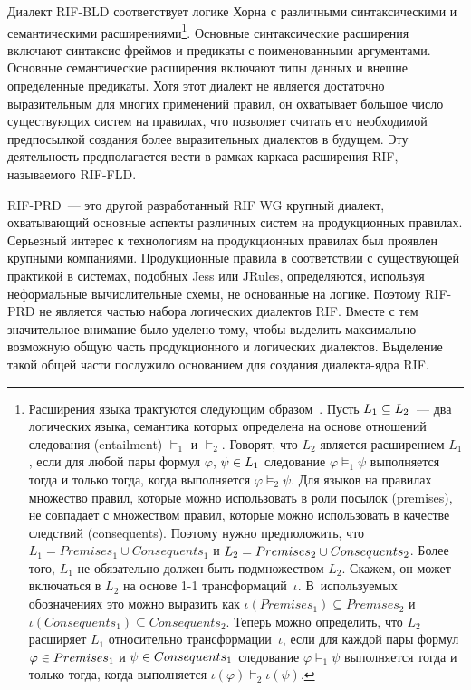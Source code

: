 \begin{multicols}{2}
Диалект RIF-BLD соответствует логике Хорна с различными синтаксическими и 
семантическими расширениями\footnote{Расширения языка трактуются следующим 
образом~\cite{25kal}. Пусть $L_1\hm\subseteq L_2$~--- два логических языка, семантика 
которых определена на основе отношений следования (entailment) $\models_1$ и 
$\models_2$. Говорят, что $L_2$ является расширением $L_1$, если для любой пары формул 
$\varphi$, $\psi\hm\in L_1$ следование $\varphi\models_1\psi$ выполняется тогда и только 
тогда, когда выполняется $\varphi\models_2\psi$. Для языков на правилах множество 
правил, которые можно использовать в роли посылок (premises), не совпадает с множеством 
правил, которые можно использовать в качестве следствий (consequents). Поэтому нужно 
предположить, что $L_1=Premises_1 \cup Consequents_1$ и $L_2\hm=Premises_2\cup 
Consequents_2$. Более того, $L_1$ не обязательно должен быть подмножеством $L_2$. Скажем, 
он может включаться в $L_2$ на основе 1-1 трансформаций~$\iota$. В~используемых 
обозначениях это можно выразить как $\iota(Premises_1)\subseteq Premises_2$ и 
$\iota(Consequents_1)\subseteq Consequents_2$. Теперь можно определить, что $L_2$ 
расширяет $L_1$ относительно трансформации~$\iota$, если для каждой пары формул 
$\varphi\hm\in Premises_1$ и $\psi\hm\in Consequents_1$ следование $\varphi\models_1\psi$ 
выполняется тогда и только тогда, когда выполняется $\iota (\varphi)\models_2\iota 
(\psi)$.}. Основные синтаксические расширения включают синтаксис фреймов и предикаты 
с поименованными аргументами. Основные семантические расширения включают типы 
данных и внешне определенные предикаты. Хотя этот диалект не является достаточно 
выразительным для многих применений правил, он охватывает большое число 
существующих систем на правилах, что позволяет считать его необходимой предпосылкой 
создания более выразительных диалектов в будущем. Эту деятельность предполагается 
вести в рамках каркаса расширения RIF, называемого RIF-FLD.

RIF-PRD~--- это другой разработанный RIF WG крупный диалект, охватывающий основные 
аспекты различных систем на продукционных правилах. Серьезный интерес к технологиям 
на продукционных правилах был проявлен крупными компаниями. Продукционные 
правила в соответствии с существующей практикой в системах, подобных Jess или JRules, 
определяются, используя неформальные вычислительные схемы, не основанные на логике. 
Поэтому RIF-PRD не является частью набора логических диалектов RIF. Вместе с тем 
значительное внимание было уделено тому, чтобы выделить максимально возможную 
общую часть продукционного и логических диалектов. Выделение такой общей части 
послужило основанием для создания диа\-лек\-та-яд\-ра RIF.


\end{multicols}
